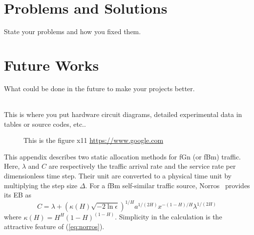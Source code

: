 \documentclass[12pt,oneside,openright,a4paper]{cpe-english-project}
\begin{document}
\section{Problems and Solutions}
State your problems and how you fixed them.

\section{Future Works}
What could be done in the future to make your projects better.



\makeatletter
\g@addto@macro{\UrlBreaks}{\UrlOrds}
\makeatother
% 




 \\

This is where you put hardware circuit diagrams, detailed experimental data in tables or source codes, etc.. \\ \bigskip

 \begin{figure}[!h]
\caption{This is the figure x11 \href{https://www.google.com} {https://www.google.com}}\label{fig:x1}
\end{figure}

This appendix describes two static allocation methods for fGn (or fBm)
traffic. Here, $\lambda$ and $C$ are respectively the traffic arrival
rate and the service rate per dimensionless time step. Their unit are
converted to a physical time unit by multiplying the step size
$\Delta$. For a fBm self-similar traffic source,
Norros~\cite{norros95} provides its EB as
\begin{equation}\label{eq:norros}
  C = \lambda + (\kappa(H)\sqrt{-2\ln\epsilon})^{1/H}a^{1/(2H)}x^{-(1-H)/H}\lambda^{1/(2H)}
\end{equation}
where $\kappa(H) = H^H(1-H)^{(1-H)}$. Simplicity in the calculation is
the attractive feature of (\ref{eq:norros}).
\end{document}
